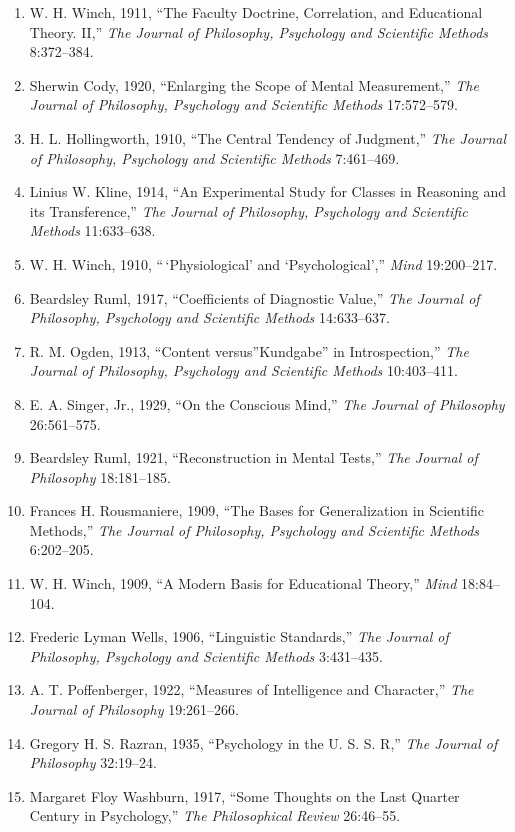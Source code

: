 \documentclass[
]{article}
\begin{document}
\begin{enumerate}
\def\labelenumi{\arabic{enumi}.}
\item
  W. H. Winch, 1911, ``The Faculty Doctrine, Correlation, and
  Educational Theory. II,'' \emph{The Journal of Philosophy, Psychology
  and Scientific Methods} 8:372--384.
\item
  Sherwin Cody, 1920, ``Enlarging the Scope of Mental Measurement,''
  \emph{The Journal of Philosophy, Psychology and Scientific Methods}
  17:572--579.
\item
  H. L. Hollingworth, 1910, ``The Central Tendency of Judgment,''
  \emph{The Journal of Philosophy, Psychology and Scientific Methods}
  7:461--469.
\item
  Linius W. Kline, 1914, ``An Experimental Study for Classes in
  Reasoning and its Transference,'' \emph{The Journal of Philosophy,
  Psychology and Scientific Methods} 11:633--638.
\item
  W. H. Winch, 1910, ``\,`Physiological' and `Psychological',''
  \emph{Mind} 19:200--217.
\item
  Beardsley Ruml, 1917, ``Coefficients of Diagnostic Value,'' \emph{The
  Journal of Philosophy, Psychology and Scientific Methods} 14:633--637.
\item
  R. M. Ogden, 1913, ``Content versus''Kundgabe'' in Introspection,''
  \emph{The Journal of Philosophy, Psychology and Scientific Methods}
  10:403--411.
\item
  E. A. Singer, Jr., 1929, ``On the Conscious Mind,'' \emph{The Journal
  of Philosophy} 26:561--575.
\item
  Beardsley Ruml, 1921, ``Reconstruction in Mental Tests,'' \emph{The
  Journal of Philosophy} 18:181--185.
\item
  Frances H. Rousmaniere, 1909, ``The Bases for Generalization in
  Scientific Methods,'' \emph{The Journal of Philosophy, Psychology and
  Scientific Methods} 6:202--205.
\item
  W. H. Winch, 1909, ``A Modern Basis for Educational Theory,''
  \emph{Mind} 18:84--104.
\item
  Frederic Lyman Wells, 1906, ``Linguistic Standards,'' \emph{The
  Journal of Philosophy, Psychology and Scientific Methods} 3:431--435.
\item
  A. T. Poffenberger, 1922, ``Measures of Intelligence and Character,''
  \emph{The Journal of Philosophy} 19:261--266.
\item
  Gregory H. S. Razran, 1935, ``Psychology in the U. S. S. R,''
  \emph{The Journal of Philosophy} 32:19--24.
\item
  Margaret Floy Washburn, 1917, ``Some Thoughts on the Last Quarter
  Century in Psychology,'' \emph{The Philosophical Review} 26:46--55.
\end{enumerate}
\end{document}
